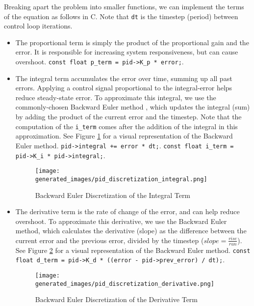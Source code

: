 \documentclass[main.tex]{subfiles}
\begin{document}
\noindent Breaking apart the problem into smaller functions, we can implement the terms of the equation as follows in C. Note that \texttt{dt} is the timestep (period) between control loop iterations.
\begin{itemize}
    \item The proportional term is simply the product of the proportional gain and the error. It is responsible for increasing system responsiveness, but can cause overshoot. \newline
    \texttt{const float p\_term = pid->K\_p * error;}.
    \item The integral term accumulates the error over time, summing up all past errors. Applying a control signal proportional to the integral-error helps reduce steady-state error. To approximate this integral, we use the commonly-chosen Backward Euler method \cite{AbramovitchPID}, which updates the integral (sum) by adding the product of the current error and the timestep. Note that the computation of the \texttt{i\_term} comes after the addition of the integral in this approximation. See Figure \ref{fig:pid-backward-euler-integral} for a visual representation of the Backward Euler method.
    \newline
    \texttt{pid->integral += error * dt;}. \newline
    \texttt{const float i\_term = pid->K\_i * pid->integral;}.
    \begin{figure}[H]
        \centering
        \texttt{[image: generated\_images/pid\_discretization\_integral.png]}
        \caption{Backward Euler Discretization of the Integral Term}
        \label{fig:pid-backward-euler-integral}
    \end{figure}

    \item The derivative term is the rate of change of the error, and can help reduce overshoot. To approximate this derivative, we use the Backward Euler method, which calculates the derivative (slope) as the difference between the current error and the previous error, divided by the timestep ($slope =  \frac{rise}{run}$). See Figure \ref{fig:pid-backward-euler-derivative} for a visual representation of the Backward Euler method.
    \newline
    \texttt{const float d\_term = pid->K\_d * ((error - pid->prev\_error) / dt);}.
    \begin{figure}[H]
        \centering
        \texttt{[image: generated\_images/pid\_discretization\_derivative.png]}
        \caption{Backward Euler Discretization of the Derivative Term}
        \label{fig:pid-backward-euler-derivative}
    \end{figure}

\end{itemize}
\end{document}
